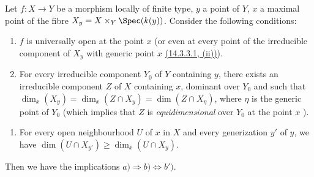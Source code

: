 \begin{proposition}[14.3.13]
\label{IV.14.3.13}
Let $f:X\to Y$ be a morphism locally of finite type, $y$ a point of $Y$, $x$ a maximal point of the fibre $X_y=X\times_Y\Spec(k(y))$.
Consider the following conditions:
\begin{enumerate}[label=\emph{\alph*)}]
  \item $f$ is universally open at the point $x$ (or even at every point of the irreducible component of $X_y$ with generic point $x$ {\hyperlink{ega4.c04.subsec.14-3-3-1}{(14.3.3.1, (ii))}}).
  \item For every irreducible component $Y_0$ of $Y$ containing $y$, there exists an irreducible component $Z$ of $X$ containing $x$, dominant over $Y_0$ and such that $\dim_x(X_y)=\dim_x(Z\cap X_y)=\dim(Z\cap X_\eta)$, where $\eta$ is the generic point of $Y_0$ (which implies that $Z$ is \emph{equidimensional} over $Y_0$ at the point $x$ ).
\end{enumerate}


\begin{enumerate}[label=\emph{\alph*$'$)}]
  \item[b$'$)] For every open neighbourhood $U$ of $x$ in $X$ and every generization $y'$ of $y$, we have $\dim(U\cap X_{y'})\geq\dim_x(U\cap X_y)$.
\end{enumerate}

Then we have the implications $a)\Rightarrow b)\Leftrightarrow b')$.
\end{proposition}

